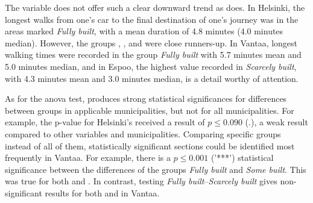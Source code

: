 The variable  does not offer such a clear downward trend as  does. In Helsinki, the longest walks from one's car to the final destination of one's journey was in the areas marked \textit{Fully built}, with a mean duration of 4.8 minutes (4.0 minutes median). However, the groups , , and  were close runners-up. In Vantaa, longest walking times were recorded in the group \textit{Fully built} with 5.7 minutes mean and 5.0 minutes median, and in Espoo, the highest value recorded in \textit{Scarcely built}, with 4.3 minutes mean and 3.0 minutes median, is a detail worthy of attention.

As for the \acrshort{anova} test,  produces strong statistical significances for differences between groups in applicable municipalities, but not for all municipalities. For example, the p-value for Helsinki's  received a result of $p \leq 0.090$ (.), a weak result compared to other variables and municipalities. Comparing specific groups instead of all of them, statistically significant sections could be identified most frequently in Vantaa. For example, there is a $p \leq 0.001$ ('***') statistical significance between the differences of the groups \textit{Fully built} and \textit{Some built}. This was true for both  and . In contrast, testing \textit{Fully built}--\textit{Scarcely built} gives non-significant results for both  and  in Vantaa.

